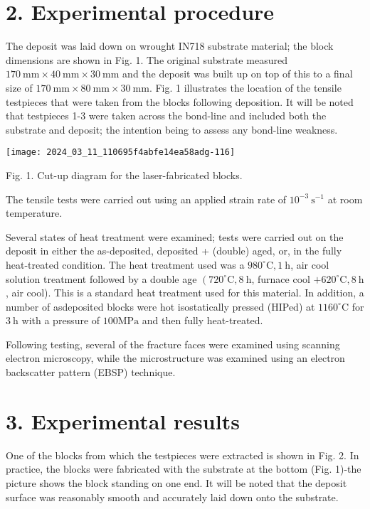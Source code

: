 \documentclass[10pt]{article}
\begin{document}
\section*{2. Experimental procedure}
The deposit was laid down on wrought IN718 substrate material; the block dimensions are shown in Fig. 1. The original substrate measured $170 \mathrm{~mm} \times 40 \mathrm{~mm} \times 30 \mathrm{~mm}$ and the deposit was built up on top of this to a final size of $170 \mathrm{~mm} \times 80 \mathrm{~mm} \times 30 \mathrm{~mm}$. Fig. 1 illustrates the location of the tensile testpieces that were taken from the blocks following deposition. It will be noted that testpieces 1-3 were taken across the bond-line and included both the substrate and deposit; the intention being to assess any bond-line weakness.

\begin{center}
\texttt{[image: 2024\_03\_11\_110695f4abfe14ea58adg-116]}
\end{center}

Fig. 1. Cut-up diagram for the laser-fabricated blocks.

The tensile tests were carried out using an applied strain rate of $10^{-3} \mathrm{~s}^{-1}$ at room temperature.

Several states of heat treatment were examined; tests were carried out on the deposit in either the as-deposited, deposited + (double) aged, or, in the fully heat-treated condition. The heat treatment used was a $980^{\circ} \mathrm{C}, 1 \mathrm{~h}$, air cool solution treatment followed by a double age $\left(720^{\circ} \mathrm{C}, 8 \mathrm{~h}\right.$, furnace cool $+620^{\circ} \mathrm{C}, 8 \mathrm{~h}$, air cool). This is a standard heat treatment used for this material. In addition, a number of asdeposited blocks were hot isostatically pressed (HIPed) at $1160^{\circ} \mathrm{C}$ for $3 \mathrm{~h}$ with a pressure of $100 \mathrm{MPa}$ and then fully heat-treated.

Following testing, several of the fracture faces were examined using scanning electron microscopy, while the microstructure was examined using an electron backscatter pattern (EBSP) technique.

\section*{3. Experimental results}
One of the blocks from which the testpieces were extracted is shown in Fig. 2. In practice, the blocks were fabricated with the substrate at the bottom (Fig. 1)-the picture shows the block standing on one end. It will be noted that the deposit surface was reasonably smooth and accurately laid down onto the substrate.
\end{document}
